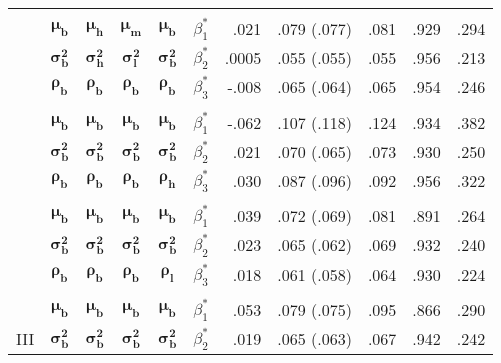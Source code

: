 \documentclass[lineno]{biometrika}
\begin{document}
\begin{table}
{\begin{tabular}{ccccccrcccc}
\vspace{-3mm} &&&&&&&&&&\\
   & $\boldsymbol{\mu_b}$ & $\boldsymbol{\mu_h}$ & $\boldsymbol{\mu_m}$ &  $\boldsymbol{\mu_b}$  & $\beta_{1}^{*}$ & .021 & .079 (.077) & .081 & .929 & .294 \\
  & $\boldsymbol{\sigma_b^2}$ & $\boldsymbol{\sigma_h^2}$ & $\boldsymbol{\sigma_l^2}$ & $\boldsymbol{\sigma_b^2}$ & $\beta_{2}^{*}$&  .0005 & .055 (.055) & .055 & .956 & .213 \\
   & $\boldsymbol{\rho_b}$ & $\boldsymbol{\rho_b}$ & $\boldsymbol{\rho_b}$ & $\boldsymbol{\rho_b}$ & $\beta_{3}^{*}$ &  -.008 & .065 (.064) & .065 & .954 & .246 \\   %
\vspace{-1mm} & & &&&&&&&& \\
  & $\boldsymbol{\mu_b}$ & $\boldsymbol{\mu_b}$ & $\boldsymbol{\mu_b}$ & $\boldsymbol{\mu_b}$ & $\beta_{1}^{*}$ & -.062 & .107 (.118) & .124 & .934 & .382 \\
 & $\boldsymbol{\sigma_b^2}$ & $\boldsymbol{\sigma_b^2}$ & $\boldsymbol{\sigma_b^2}$ & $\boldsymbol{\sigma_b^2}$  & $\beta_{2}^{*}$&   .021 & .070 (.065) & .073 & .930 & .250 \\
  & $\boldsymbol{\rho_b}$ & $\boldsymbol{\rho_b}$ & $\boldsymbol{\rho_b}$ & $\boldsymbol{\rho_h}$ & $\beta_{3}^{*}$ &  .030 & .087 (.096) & .092 & .956 & .322 \\   %
\vspace{-3mm} & & &&&&&&&& \\
  &  $\boldsymbol{\mu_b}$ & $\boldsymbol{\mu_b}$ & $\boldsymbol{\mu_b}$ & $\boldsymbol{\mu_b}$ & $\beta_{1}^{*}$ &  .039 & .072 (.069) & .081 & .891 & .264 \\
 &  $\boldsymbol{\sigma_b^2}$ & $\boldsymbol{\sigma_b^2}$ & $\boldsymbol{\sigma_b^2}$ & $\boldsymbol{\sigma_b^2}$ &  $\beta_{2}^{*}$&  .023 & .065 (.062) & .069 & .932 & .240 \\
  & $\boldsymbol{\rho_b}$ & $\boldsymbol{\rho_b}$ & $\boldsymbol{\rho_b}$ & $\boldsymbol{\rho_l}$ & $\beta_{3}^{*}$ &  .018 & .061 (.058) & .064 & .930 & .224 \\   %
  \vspace{-3mm} & & &&&&&&&& \\
   &  $\boldsymbol{\mu_b}$ & $\boldsymbol{\mu_b}$ & $\boldsymbol{\mu_b}$ & $\boldsymbol{\mu_b}$ & $\beta_{1}^{*}$ &  .053 & .079 (.075) & .095 & .866 & .290 \\
 III &  $\boldsymbol{\sigma_b^2}$ & $\boldsymbol{\sigma_b^2}$ & $\boldsymbol{\sigma_b^2}$ & $\boldsymbol{\sigma_b^2}$ &  $\beta_{2}^{*}$&  .019 & .065 (.063) & .067 & .942 & .242 \\

\end{tabular}}
\end{table}
\end{document}
